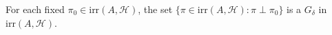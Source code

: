 For each fixed $\pi_0 \in \text{irr}(A, \mathcal{H})$, the set $\{\pi \in \text{irr}(A, \mathcal{H}) : \pi \perp \pi_0\}$ is a $G_\delta$ in $\text{irr}(A, \mathcal{H})$.
